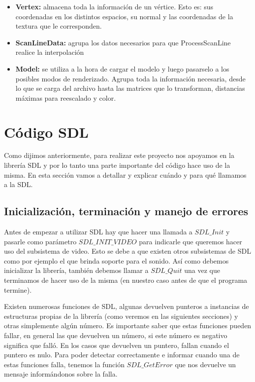 \documentclass[a4paper]{article}
\newcounter{col}
\begin{document}
\begin{itemize}
\item \textbf{Vertex: } almacena toda la información de un vértice. Esto es: sus coordenadas en los distintos espacios, su normal y las coordenadas de la textura que le corresponden.
\item \textbf{ScanLineData:} agrupa los datos necesarios para que ProcessScanLine realice la interpolación
\item \textbf{Model:} se utiliza a la hora de cargar el modelo y luego pasarselo a los posibles modos de renderizado. Agrupa toda la información necesaria, desde lo que se carga del archivo hasta las matrices que lo transforman, distancias máximas para reescalado y color.
\end{itemize}

\section{Código SDL}
Como dijimos anteriormente, para realizar este proyecto nos apoyamos en la librería SDL y por lo tanto una parte importante del código hace uso de la misma. En esta sección vamos a detallar y explicar cuándo y para qué llamamos a la SDL.


\subsection{Inicialización, terminación y manejo de errores}
Antes de empezar a utilizar SDL hay que hacer una llamada a $SDL\_Init$ y pasarle como parámetro $SDL\_INIT\_VIDEO$ para indicarle que queremos hacer uso del subsistema de video. Esto se debe a que existen otros subsistemas de SDL como por ejemplo el que brinda soporte para el sonido. Así como debemos inicializar la librería, también debemos llamar a $SDL\_Quit$ una vez que terminamos de hacer uso de la misma (en nuestro caso antes de que el programa termine).
\par Existen numerosas funciones de SDL, algunas devuelven punteros a instancias de estructuras propias de la librería (como veremos en las siguientes secciones) y otras simplemente algún número. Es importante saber que estas funciones pueden fallar, en general las que devuelven un número, si este número es negativo significa que falló. En los casos que devuelven un puntero, fallan cuando el puntero es nulo. Para poder detectar correctamente e informar cuando una de estas funciones falla, tenemos la función $SDL\_GetError$ que nos devuelve un mensaje informándonos sobre la falla.
\end{document}
